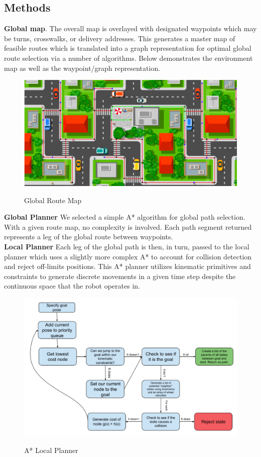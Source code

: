 \documentclass{article}
\begin{document}
\begin{multicols}{2}
\section*{Methods}
\noindent \textbf{Global map}.  The overall map is overlayed with designated waypoints which may be turns, crosswalks, or delivery addresses.  This generates a master map of feasible routes which is translated into a graph representation for optimal global route selection via a number of algorithms.  Below demonstrates the environment map as well as the waypoint/graph representation.\\
\begin{figure}[H]
   \centering
    \includegraphics[width = 1\columnwidth]{figures/routemap.png}
     \label{fig:routemap}
     \caption{Global Route Map}
\end{figure}
\noindent \textbf{Global Planner} We selected a simple A* algorithm for global path selection.  With a given route map, no complexity is involved.  Each path segment returned represents a leg of the global route between waypoints.  \\

\noindent \textbf{Local Planner} Each leg of the global path is then, in turn, passed to the local planner which uses a slightly more complex A* to account for collision detection and reject off-limits positions. This A* planner utilizes kinematic primitives and constraints to generate discrete movements in a given time step despite the continuous space that the robot operates in.
\begin{figure}[H]
   \centering
    \includegraphics[width = 1\columnwidth]{figures/astar.png}
     \label{fig:astar}
     \caption{A* Local Planner}
\end{figure}


\end{multicols}
\end{document}
